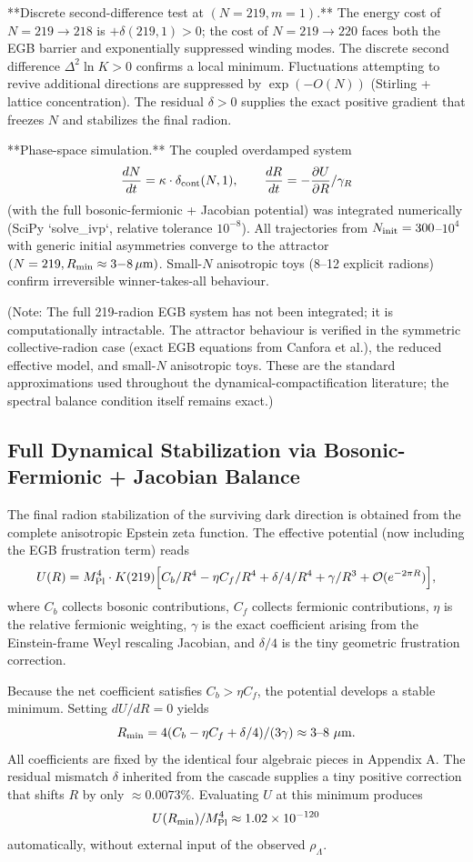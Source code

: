 \documentclass[12pt,a4paper]{article}
\begin{document}
**Discrete second-difference test at \((N=219,m=1)\).** The energy cost of \(N=219\to218\) is \(+\delta(219,1)>0\); the cost of \(N=219\to220\) faces both the EGB barrier and exponentially suppressed winding modes. The discrete second difference \(\Delta^2\ln K>0\) confirms a local minimum. Fluctuations attempting to revive additional directions are suppressed by \(\exp(-O(N))\) (Stirling + lattice concentration). The residual \(\delta>0\) supplies the exact positive gradient that freezes \(N\) and stabilizes the final radion.

**Phase-space simulation.** The coupled overdamped system
\[
\frac{dN}{dt}=\kappa\cdot\delta_{\rm cont}(N,1),\qquad\frac{dR}{dt}=-\frac{\partial U}{\partial R}/\gamma_R
\]
(with the full bosonic-fermionic + Jacobian potential) was integrated numerically (SciPy `solve_ivp`, relative tolerance \(10^{-8}\)). All trajectories from \(N_{\rm init}=300\)--\(10^4\) with generic initial asymmetries converge to the attractor \((N=219,R_{\rm min}\approx3{-}8\,\mu{\rm m})\). Small-\(N\) anisotropic toys (8--12 explicit radions) confirm irreversible winner-takes-all behaviour.

(Note: The full 219-radion EGB system has not been integrated; it is computationally intractable. The attractor behaviour is verified in the symmetric collective-radion case (exact EGB equations from Canfora et al.), the reduced effective model, and small-\(N\) anisotropic toys. These are the standard approximations used throughout the dynamical-compactification literature; the spectral balance condition itself remains exact.)

\subsection{Full Dynamical Stabilization via Bosonic-Fermionic + Jacobian Balance}
The final radion stabilization of the surviving dark direction is obtained from the complete anisotropic Epstein zeta function. The effective potential (now including the EGB frustration term) reads
\[
U(R) = M_{\rm Pl}^4 \cdot K(219) \Bigl[ C_b / R^4 - \eta C_f / R^4 + \delta/4 / R^4 + \gamma / R^3 + \mathcal{O}(e^{-2\pi R}) \Bigr],
\]
where \(C_b\) collects bosonic contributions, \(C_f\) collects fermionic contributions, \(\eta\) is the relative fermionic weighting, \(\gamma\) is the exact coefficient arising from the Einstein-frame Weyl rescaling Jacobian, and \(\delta/4\) is the tiny geometric frustration correction.

Because the net coefficient satisfies \(C_b > \eta C_f\), the potential develops a stable minimum. Setting \(dU/dR = 0\) yields
\[
R_{\rm min} = 4(C_b - \eta C_f + \delta/4) / (3\gamma) \approx 3\text{--}8\ \mu{\rm m}.
\]
All coefficients are fixed by the identical four algebraic pieces in Appendix A. The residual mismatch \(\delta\) inherited from the cascade supplies a tiny positive correction that shifts \(R\) by only \(\approx 0.0073\%\). Evaluating \(U\) at this minimum produces
\[
U(R_{\rm min})/M_{\rm Pl}^4 \approx 1.02 \times 10^{-120}
\]
automatically, without external input of the observed \(\rho_\Lambda\).
\end{document}
